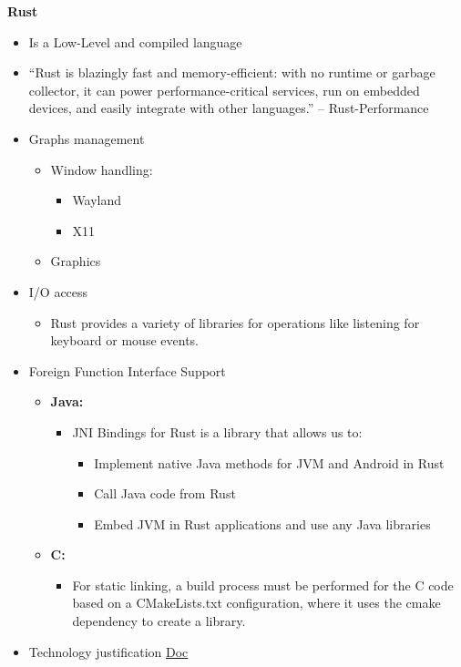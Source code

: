 \documentclass[a4paper,12pt]{article}
\begin{document}
\textbf{Rust}
\begin{itemize}
    \item Is a Low-Level and compiled language
    \item ``Rust is blazingly fast and memory-efficient: with no runtime or garbage collector, it can power performance-critical services, run on embedded devices, and easily integrate with other languages.'' – Rust-Performance
    \item Graphs management
    \begin{itemize}
        \item Window handling: 
        \begin{itemize}
            \item Wayland
            \item X11
        \end{itemize}
        \item Graphics
    \end{itemize}
    \item I/O access
    \begin{itemize}
        \item Rust provides a variety of libraries for operations like listening for keyboard or mouse events.
    \end{itemize}
    \item Foreign Function Interface Support
    \begin{itemize}
        \item \textbf{Java:}
        \begin{itemize}
            \item JNI Bindings for Rust is a library that allows us to:
            \begin{itemize}
                \item Implement native Java methods for JVM and Android in Rust
                \item Call Java code from Rust
                \item Embed JVM in Rust applications and use any Java libraries
            \end{itemize}
    
        \end{itemize}
        \item \textbf{C:}
        \begin{itemize}
            \item For static linking, a build process must be performed for the C code based on a CMakeLists.txt configuration, where it uses the cmake dependency to create a library.
        
        \end{itemize}
    \end{itemize}
    \item Technology justification \href{https://docs.google.com/document/d/1OWdCxe9lFPcMpADiyAyRCWGAioo0fwIuzMuRER24MHM/edit}{Doc}
\end{itemize}
\end{document}
